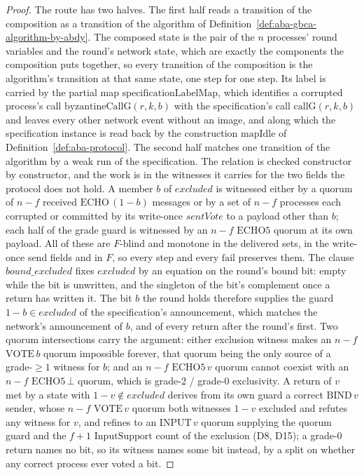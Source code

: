 \begin{proof}\leanok
  The route has two halves.
  The first half reads a transition of the composition as a transition of the algorithm of Definition~\ref{def:aba-gbca-algorithm-by-abdy}.
  The composed state is the pair of the $n$ processes' round variables and the round's network state, which are exactly the components the composition puts together, so every transition of the composition is the algorithm's transition at that same state, one step for one step.
  Its label is carried by the partial map $\mathrm{specificationLabelMap}$, which identifies a corrupted process's call $\mathrm{byzantineCallG}(r,k,b)$ with the specification's call $\mathrm{callG}(r,k,b)$ and leaves every other network event without an image, and along which the specification instance is read back by the construction $\mathrm{mapIdle}$ of Definition~\ref{def:aba-protocol}.
  The second half matches one transition of the algorithm by a weak run of the specification.
  The relation is checked constructor by constructor, and the work is in the witnesses it carries for the two fields the protocol does not hold.
  A member $b$ of $excluded$ is witnessed either by a quorum of $n{-}f$ received $\mathrm{ECHO}\,(1-b)$ messages or by a set of $n{-}f$ processes each corrupted or committed by its write-once $\mathit{sentVote}$ to a payload other than $b$; each half of the grade guard is witnessed by an $n{-}f$ $\mathrm{ECHO5}$ quorum at its own payload.
  All of these are $F$-blind and monotone in the delivered sets, in the write-once send fields and in $F$, so every step and every $\mathrm{fail}$ preserves them.
  The clause $bound\_excluded$ fixes $excluded$ by an equation on the round's bound bit: empty while the bit is unwritten, and the singleton of the bit's complement once a return has written it.
  The bit $b$ the round holds therefore supplies the guard $1-b \in excluded$ of the specification's announcement, which matches the network's announcement of $b$, and of every return after the round's first.
  Two quorum intersections carry the argument: either exclusion witness makes an $n{-}f$ $\mathrm{VOTE}\,b$ quorum impossible forever, that quorum being the only source of a grade-$\ge 1$ witness for $b$; and an $n{-}f$ $\mathrm{ECHO5}\,v$ quorum cannot coexist with an $n{-}f$ $\mathrm{ECHO5}\,\bot$ quorum, which is grade-2 / grade-0 exclusivity.
  A return of $v$ met by a state with $1-v \notin excluded$ derives from its own guard a correct $\mathrm{BIND}\,v$ sender, whose $n{-}f$ $\mathrm{VOTE}\,v$ quorum both witnesses $1-v$ excluded and refutes any witness for $v$, and refines to an $\mathrm{INPUT}\,v$ quorum supplying the quorum guard and the $f{+}1$ $\mathrm{InputSupport}$ count of the exclusion (D8, D15); a grade-0 return names no bit, so its witness names some bit instead, by a split on whether any correct process ever voted a bit.

\end{proof}
